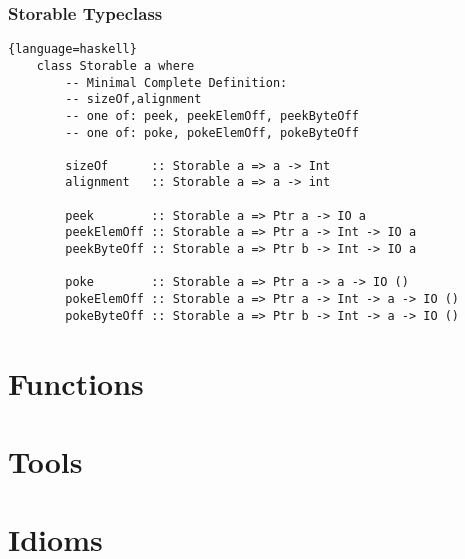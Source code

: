 \documentclass{beamer}
\begin{document}
\begin{frame}[fragile]
    \frametitle{Storable Typeclass}
    \begin{lstlisting}{language=haskell}
    class Storable a where
        -- Minimal Complete Definition:
        -- sizeOf,alignment
        -- one of: peek, peekElemOff, peekByteOff
        -- one of: poke, pokeElemOff, pokeByteOff

        sizeOf      :: Storable a => a -> Int
        alignment   :: Storable a => a -> int

        peek        :: Storable a => Ptr a -> IO a
        peekElemOff :: Storable a => Ptr a -> Int -> IO a
        peekByteOff :: Storable a => Ptr b -> Int -> IO a

        poke        :: Storable a => Ptr a -> a -> IO ()
        pokeElemOff :: Storable a => Ptr a -> Int -> a -> IO ()
        pokeByteOff :: Storable a => Ptr b -> Int -> a -> IO ()
    \end{lstlisting}
\end{frame}

\section{Functions}

\section{Tools}

\section{Idioms}

\begin{frame}
\end{frame}
\end{document}
